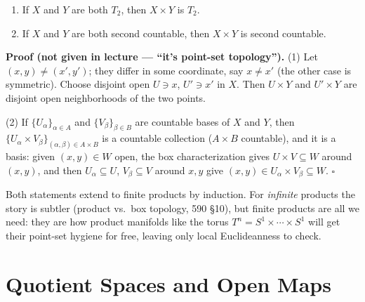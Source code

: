 \documentclass[11pt]{report}
\makeatletter
\newcounter{thmcounter}[section]
\renewenvironment{proof}[1][Proof]{\noindent\textbf{#1.} }{\hfill$\square$\par\vspace{5pt}}
\newcommand{\thmlabel}[1]{\edef\@currentlabel{\arabic{section}.\arabic{thmcounter}}\label{#1}}
\newcommand{\leeref}[1]{\par\smallskip{\raggedleft\footnotesize\textsc{Lee}:\ #1\par}}
\makeatother
\begin{document}
\begin{thmbox}\thmlabel{thm:product-inherit}
\begin{enumerate}
    \item If $X$ and $Y$ are both $T_2$, then $X \times Y$ is $T_2$.
    \item If $X$ and $Y$ are both second countable, then $X \times Y$ is second countable.
\end{enumerate}
\leeref{Example 1.8}
\end{thmbox}

\begin{proof}[Proof (not given in lecture --- ``it's point-set topology'')]
(1) Let $(x, y) \neq (x', y')$; they differ in some coordinate, say $x \neq x'$ (the other case is symmetric). Choose disjoint open $U \ni x$, $U' \ni x'$ in $X$. Then $U \times Y$ and $U' \times Y$ are disjoint open neighborhoods of the two points.

(2) If $\{U_\alpha\}_{\alpha \in A}$ and $\{V_\beta\}_{\beta \in B}$ are countable bases of $X$ and $Y$, then $\{U_\alpha \times V_\beta\}_{(\alpha,\beta) \in A \times B}$ is a countable collection ($A \times B$ countable), and it is a basis: given $(x,y) \in W$ open, the box characterization gives $U \times V \subseteq W$ around $(x,y)$, and then $U_\alpha \subseteq U$, $V_\beta \subseteq V$ around $x, y$ give $(x,y) \in U_\alpha \times V_\beta \subseteq W$.
\end{proof}

\begin{rembox}\label{rem:new-spaces-2}
Both statements extend to finite products by induction. For \emph{infinite} products the story is subtler (product vs.\ box topology, 590 \S10), but finite products are all we need: they are how product manifolds like the torus $T^n = S^1 \times \cdots \times S^1$ will get their point-set hygiene for free, leaving only local Euclideanness to check.
\end{rembox}


\section{Quotient Spaces and Open Maps}\label{sec:quotient-spaces}\label{sub:quotients}
\end{document}
